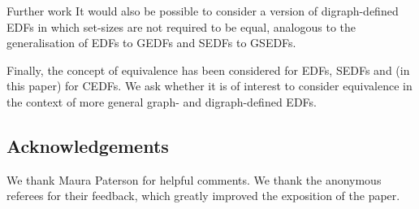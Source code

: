 \documentclass[12pt, a4paper]{article}
\theoremstyle{definition}
\begin{document}
\begin{section}{Further work}
It would also be possible to consider a version of digraph-defined EDFs in which set-sizes are not required to be equal, analogous to the generalisation of EDFs to GEDFs and SEDFs to GSEDFs.


Finally, the concept of equivalence has been considered for EDFs, SEDFs and (in this paper) for CEDFs. We ask whether it is of interest to consider equivalence in the context of more general graph- and digraph-defined EDFs.

\end{section}

\subsection*{Acknowledgements}
We thank Maura Paterson for helpful comments.  We thank the anonymous referees for their feedback, which greatly improved the exposition of the paper.
\end{document}
